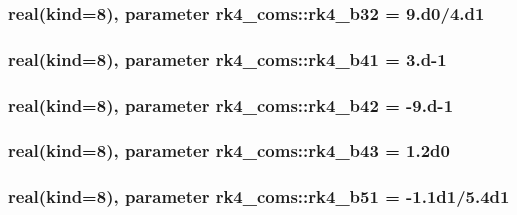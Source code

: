 \subsubsection[{rk4\+\_\+b32}]{\setlength{\rightskip}{0pt plus 5cm}real(kind=8), parameter rk4\+\_\+coms\+::rk4\+\_\+b32 = 9.d0/4.d1}\label{namespacerk4__coms_aeadece49a8e779db69ab3c866d710851}
\hypertarget{namespacerk4__coms_a027909c6e9575ba7ea384f530f1fea8c}{}
\subsubsection[{rk4\+\_\+b41}]{\setlength{\rightskip}{0pt plus 5cm}real(kind=8), parameter rk4\+\_\+coms\+::rk4\+\_\+b41 = 3.d-\/1}\label{namespacerk4__coms_a027909c6e9575ba7ea384f530f1fea8c}
\hypertarget{namespacerk4__coms_a8e97d0778db0718264f454af0d04e0da}{}
\subsubsection[{rk4\+\_\+b42}]{\setlength{\rightskip}{0pt plus 5cm}real(kind=8), parameter rk4\+\_\+coms\+::rk4\+\_\+b42 = -\/9.d-\/1}\label{namespacerk4__coms_a8e97d0778db0718264f454af0d04e0da}
\hypertarget{namespacerk4__coms_a5c0f66631b902af266e04130bea41001}{}
\subsubsection[{rk4\+\_\+b43}]{\setlength{\rightskip}{0pt plus 5cm}real(kind=8), parameter rk4\+\_\+coms\+::rk4\+\_\+b43 = 1.\+2d0}\label{namespacerk4__coms_a5c0f66631b902af266e04130bea41001}
\hypertarget{namespacerk4__coms_a0667d689a2690f395681dd54718dd9b0}{}
\subsubsection[{rk4\+\_\+b51}]{\setlength{\rightskip}{0pt plus 5cm}real(kind=8), parameter rk4\+\_\+coms\+::rk4\+\_\+b51 = -\/1.\+1d1/5.\+4d1}\label{namespacerk4__coms_a0667d689a2690f395681dd54718dd9b0}
\hypertarget{namespacerk4__coms_a08136775ca79aa4cfb6e2bc844bfb689}{}
